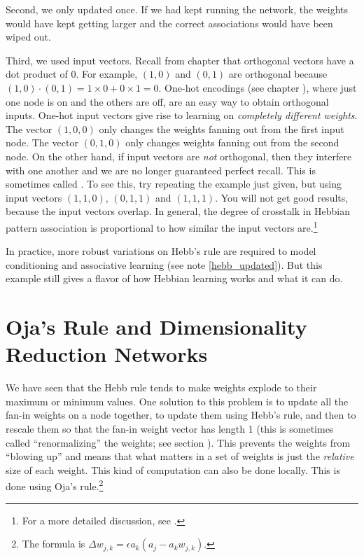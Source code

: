 Second, we only updated once. If we had kept running the network, the weights would have kept getting larger and the correct associations would have been wiped out. 

Third, we used  input vectors. Recall from chapter  that orthogonal vectors have a dot product of 0. For example, $(1,0)$ and $(0,1)$ are orthogonal because $(1,0) \cdot (0,1) = 1 \times 0 + 0 \times 1 = 0$. One-hot encodings (see chapter ), where just one node is on and the others are off, are an easy way to obtain orthogonal inputs. One-hot input vectors give rise to learning on \emph{completely different weights}. The vector $(1,0,0)$ only changes the weights fanning out from the first input node. The  vector $(0,1,0)$ only changes weights fanning out from the second node. On the other hand, if input vectors are {\em not} orthogonal, then they interfere with one another and we are no longer guaranteed perfect recall. This is sometimes called . To see this, try repeating the example just given, but using input vectors $(1,1,0)$, $(0,1,1)$ and $(1,1,1)$. You will not get good results, because the input vectors overlap. In general, the degree of crosstalk in Hebbian pattern association  is proportional to how similar the input vectors are.\footnote{For a more detailed discussion, see \cite[p.~105]{fausett1994fundamentals}.}

In practice, more robust variations on Hebb's rule are required to model conditioning and associative learning (see note \ref{hebb_updated}). But this example still gives a flavor of how Hebbian learning works and what it can do.

\section{Oja's Rule and Dimensionality Reduction Networks}


We have seen that the Hebb rule tends to make weights explode to their maximum or minimum values. One solution to this problem is to update all the fan-in weights on a node together, to update them using Hebb's rule, and then to rescale them so that the fan-in weight vector has length 1 (this is sometimes called ``renormalizing'' the weights; see section ). This prevents the weights from ``blowing up'' and means that what matters in a set of weights is just the \emph{relative} size of each weight. This kind of computation can also be done locally. This is done using Oja's rule.\footnote{The formula is $\Delta w_{j,k} = \epsilon a_k (a_j - a_k  w_{j,k})$.}

